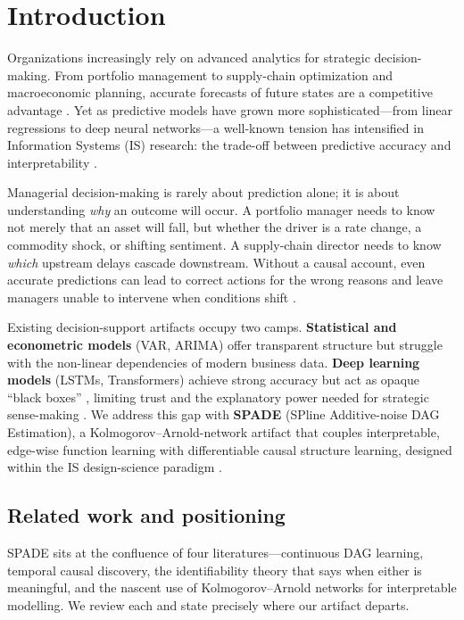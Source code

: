 
\section{Introduction}
\label{sec:intro}

Organizations increasingly rely on advanced analytics for strategic
decision-making. From portfolio management to supply-chain optimization and
macroeconomic planning, accurate forecasts of future states are a competitive
advantage \citep{Davenport2018}. Yet as predictive models have grown more
sophisticated---from linear regressions to deep neural networks---a well-known
tension has intensified in Information Systems (IS) research: the trade-off
between predictive accuracy and interpretability \citep{Rai2020,Shmueli2010}.

Managerial decision-making is rarely about prediction alone; it is about
understanding \emph{why} an outcome will occur. A portfolio manager needs to know
not merely that an asset will fall, but whether the driver is a rate change, a
commodity shock, or shifting sentiment. A supply-chain director needs to know
\emph{which} upstream delays cascade downstream. Without a causal account, even
accurate predictions can lead to correct actions for the wrong reasons and leave
managers unable to intervene when conditions shift \citep{Pearl2009}.

Existing decision-support artifacts occupy two camps. \textbf{Statistical and
econometric models} (VAR, ARIMA) offer transparent structure but struggle with
the non-linear dependencies of modern business data. \textbf{Deep learning
models} (LSTMs, Transformers) achieve strong accuracy but act as opaque
``black boxes'' \citep{Rudin2019}, limiting trust and the explanatory power
needed for strategic sense-making \citep{Gregor2006}. We address this gap with
\textbf{SPADE} (SPline Additive-noise DAG Estimation), a Kolmogorov--Arnold-network
artifact that couples interpretable, edge-wise function learning with
differentiable causal structure learning, designed within the IS design-science
paradigm \citep{Hevner2004}.

\subsection{Related work and positioning}
\label{sec:related}

SPADE sits at the confluence of four literatures---continuous DAG learning,
temporal causal discovery, the identifiability theory that says when either is
meaningful, and the nascent use of Kolmogorov--Arnold networks for interpretable
modelling. We review each and state precisely where our artifact departs.

